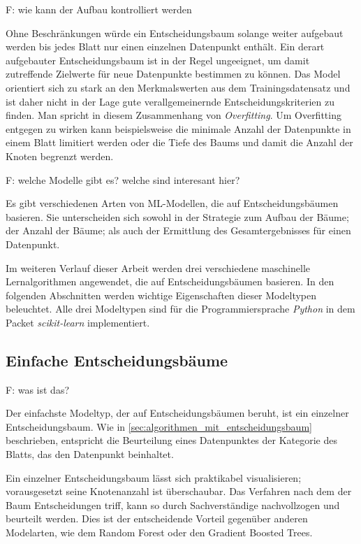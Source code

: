 F: wie kann der Aufbau kontrolliert werden

Ohne Beschränkungen würde ein Entscheidungsbaum solange weiter aufgebaut werden bis jedes Blatt nur einen einzelnen Datenpunkt enthält. Ein derart aufgebauter Entscheidungsbaum ist in der Regel ungeeignet, um damit zutreffende Zielwerte für neue Datenpunkte bestimmen zu können. Das Model orientiert sich zu stark an den Merkmalswerten aus dem Trainingsdatensatz und ist daher nicht in der Lage gute verallgemeinernde Entscheidungskriterien zu finden. Man spricht in diesem Zusammenhang von \textit{Overfitting}. Um Overfitting entgegen zu wirken kann beispielsweise die minimale Anzahl der Datenpunkte in einem Blatt limitiert werden oder die Tiefe des Baums und damit die Anzahl der Knoten begrenzt werden.

F: welche Modelle gibt es? welche sind interesant hier?

Es gibt verschiedenen Arten von ML-Modellen, die auf Entscheidungsbäumen basieren. Sie unterscheiden sich sowohl in der Strategie zum Aufbau der Bäume; der Anzahl der Bäume; als auch der Ermittlung des Gesamtergebnisses für einen Datenpunkt. 

Im weiteren Verlauf dieser Arbeit werden drei verschiedene maschinelle Lernalgorithmen angewendet, die auf Entscheidungsbäumen basieren. In den folgenden Abschnitten werden wichtige Eigenschaften dieser Modeltypen beleuchtet. Alle drei Modeltypen sind für die Programmiersprache \textit{Python} in dem Packet \textit{scikit-learn} implementiert.
\subsection{Einfache Entscheidungsbäume}
\label{sec:einfache_entscheidungsbaeume}
F: was ist das?

Der einfachste Modeltyp, der auf Entscheidungsbäumen beruht, ist ein einzelner Entscheidungsbaum. Wie in \cref{sec:algorithmen_mit_entscheidungsbaum} beschrieben, entspricht die Beurteilung eines Datenpunktes der Kategorie des Blatts, das den Datenpunkt beinhaltet.

Ein einzelner Entscheidungsbaum lässt sich praktikabel visualisieren; vorausgesetzt seine Knotenanzahl ist überschaubar. Das Verfahren nach dem der Baum Entscheidungen triff, kann so durch Sachverständige nachvollzogen und beurteilt werden. Dies ist der entscheidende Vorteil gegenüber anderen Modelarten, wie dem Random Forest oder den Gradient Boosted Trees.

